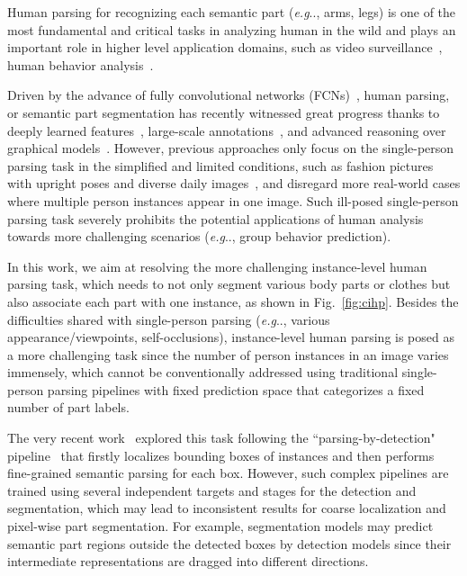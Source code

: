 \documentclass[runningheads]{llncs}
\makeatletter
\DeclareRobustCommand\onedot{\futurelet\@let@token\@onedot}
\def\@onedot{\ifx\@let@token.\else.\null\fi\xspace}
\def\eg{\emph{e.g}\onedot} \def\Eg{\emph{E.g}\onedot}
\makeatother
\begin{document}
Human parsing for recognizing each semantic part (\eg, arms, legs) is one of the most fundamental and critical tasks in analyzing human in the wild and plays an important role in higher level application domains, such as video surveillance~\cite{wang2014deformable}, human behavior analysis~\cite{gan2016concepts,liang2015proposal}. 

Driven by the advance of fully convolutional networks (FCNs)~\cite{long2014fully}, human parsing, or semantic part segmentation has recently witnessed great progress thanks to deeply learned features~\cite{simonyan2014very,he2015deep}, large-scale annotations~\cite{DBLP:journals/corr/LinMBHPRDZ14,Gong_2017_CVPR}, and advanced reasoning over graphical models~\cite{crfasrnn,chen2016deeplab}. However, previous approaches only focus on the single-person parsing task in the simplified and limited conditions, such as fashion pictures~\cite{Yamaguchiparsing13,Dongparsing13,ATR,Co-CNN,chen2014detect} with upright poses and diverse daily images~\cite{Gong_2017_CVPR}, and disregard more real-world cases where multiple person instances appear in one image.  Such ill-posed single-person parsing task severely prohibits the potential applications of human analysis towards more challenging scenarios (\eg, group behavior prediction). 

In this work, we aim at resolving the more challenging instance-level human parsing task, which needs to not only segment various body parts or clothes but also associate each part with one instance, as shown in Fig.~\ref{fig:cihp}. Besides the difficulties shared with single-person parsing (\eg, various appearance/viewpoints, self-occlusions), instance-level human parsing is posed as a more challenging task since the number of person instances in an image varies immensely, which cannot be conventionally addressed using traditional single-person parsing pipelines with fixed prediction space that categorizes a fixed number of part labels.

The very recent work~\cite{li2017holistic} explored this task following the ``parsing-by-detection" pipeline~\cite{hariharan2014simultaneous,liang2016reversible,Dai_2016_CVPR,pinheiro2015learning,He_2017_ICCV} that firstly localizes bounding boxes of instances and then performs fine-grained semantic parsing for each box. However, such complex pipelines are trained using several independent targets and stages for the detection and segmentation, which may lead to inconsistent results for coarse localization and pixel-wise part segmentation. For example, segmentation models may predict semantic part regions outside the detected boxes by detection models since their intermediate representations are dragged into different directions. 
\end{document}
